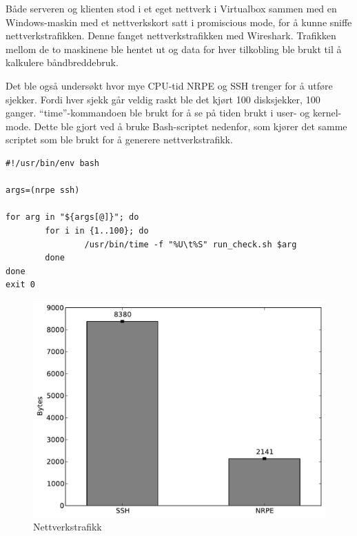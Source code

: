Både serveren og klienten stod i et eget nettverk i Virtualbox sammen med en Windows-maskin med et nettverkskort satt i promiscious mode, for å kunne sniffe nettverkstrafikken. Denne fanget nettverkstrafikken med Wireshark. Trafikken mellom de to maskinene ble hentet ut og data for hver tilkobling ble brukt til å kalkulere båndbreddebruk.

Det ble også undersøkt hvor mye CPU-tid NRPE og SSH trenger for å utføre sjekker. Fordi hver sjekk går veldig raskt ble det kjørt 100 disksjekker, 100 ganger. ``time''-kommandoen ble brukt for å se på tiden brukt i user- og kernel-mode. Dette ble gjort ved å bruke Bash-scriptet nedenfor, som kjører det samme scriptet som ble brukt for å generere nettverkstrafikk.

\begin{lstlisting}[style=example]
#!/usr/bin/env bash

args=(nrpe ssh)

for arg in "${args[@]}"; do
        for i in {1..100}; do
                /usr/bin/time -f "%U\t%S" run_check.sh $arg
        done
done
exit 0
\end{lstlisting}

\begin{figure}[H]
    \centering
    \includegraphics[scale=0.6]{img/nettverkstrafikk}
    \caption{Nettverkstrafikk}
    \label{network_traffic}
\end{figure}


